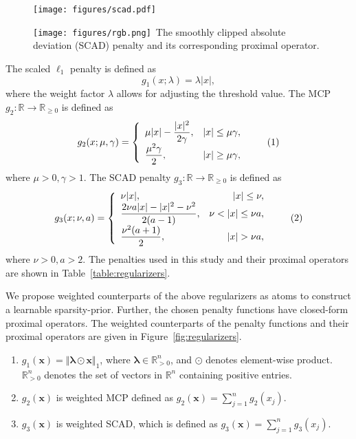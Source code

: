 \documentclass[journal]{IEEEtran}
\newcommand\numberthis{\addtocounter{equation}{1}\tag{\theequation}}
\newcommand{\rgbsymbol}{\texttt{[image: figures/rgb.png]}}
\begin{document}
\begin{figure}[t]
    \centering
    \texttt{[image: figures/scad.pdf]}
    \caption{\protect\rgbsymbol~The smoothly clipped absolute deviation (SCAD) penalty and its corresponding proximal operator.} \label{fig:scad}
\end{figure}%

The scaled $\ell_1$ penalty is defined as 
\begin{equation}
    \label{eq:l1}
    g_1(x; \lambda)=\lambda \left| x \right|,
\end{equation}
where the weight factor $\lambda$ allows for adjusting the threshold value. The MCP $g_{2}: \mathbb{R} \rightarrow \mathbb{R}_{\geq 0}$ is defined as
\begin{gather*}
	g_{2}(x; \mu, \gamma) = \left\{\begin{array}{lr}
		\displaystyle \mu |x| - \frac{|x|^2}{2\gamma}, & |x| \leq \mu\gamma,\\
		\displaystyle \frac{\mu^2 \gamma}{2}, & |x| \geq \mu\gamma,
	\end{array}\right. \numberthis \label{MCP}
\end{gather*}
where $\mu > 0, \gamma > 1$. The SCAD penalty $g_{3}: \mathbb{R} \rightarrow \mathbb{R}_{\geq 0}$ is defined as
\begin{gather*}
	g_{3}(x;\nu,a) = \left\{\begin{array}{lr}
		\nu|x|, & |x|\leq\nu,\\
		\displaystyle \frac{2\nu a|x|-|x|^{2}-\nu^{2}}{2(a-1)}, & \nu<|x|\leq \nu a,\\
		\displaystyle \frac{\nu^{2}(a+1)}{2}, & |x|>\nu a,
	\end{array}\right. 
	\numberthis \label{SCAD}
\end{gather*}
where $\nu > 0, a > 2$. The penalties used in this study and their proximal operators are shown in Table~\ref{table:regularizers}. 

We propose weighted counterparts of the above regularizers as atoms to construct a learnable sparsity-prior. Further, the chosen penalty functions have closed-form proximal operators. The weighted counterparts of the penalty functions and their proximal operators are given in Figure~\ref{fig:regularizers}.

\begin{enumerate}
    \item $g_{1}(\boldsymbol{x}) = \Vert\boldsymbol{\lambda} \odot \boldsymbol{x}\Vert_1$, where $\boldsymbol{\lambda} \in \mathbb{R}^{n}_{> 0}$, and $\odot$ denotes element-wise product. $\mathbb{R}^{n}_{> 0}$ denotes the set of vectors in $\mathbb{R}^{n}$ containing positive entries.
    \item $g_2(\boldsymbol{x})$ is weighted MCP defined as $g_2(\boldsymbol{x}) = \sum_{j=1}^n g_2(x_j).$
    \item $g_3(\boldsymbol{x})$ is weighted SCAD, which is defined as $g_3(\boldsymbol{x}) = \sum_{j=1}^n g_3(x_j).$
\end{enumerate}
\end{document}
